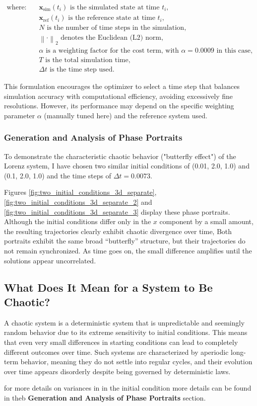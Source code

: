 \begin{align*}
\text{where:} \quad
& \mathbf{x}_{\text{sim}}(t_i) \text{ is the simulated state at time } t_i, \\
& \mathbf{x}_{\text{ref}}(t_i) \text{ is the reference state at time } t_i, \\
& N \text{ is the number of time steps in the simulation}, \\
& \left\| \cdot \right\|_2 \text{ denotes the Euclidean (L2) norm}, \\
& \alpha \text{ is a weighting factor for the cost term, with } \alpha = 0.0009 \text{ in this case}, \\
& T \text{ is the total simulation time}, \\
& \Delta t \text{ is the time step used.}
\end{align*}

\noindent
This formulation encourages the optimizer to select a time step that balances simulation accuracy with computational efficiency, avoiding excessively fine resolutions. However, its performance may depend on the specific weighting parameter $\alpha$ (manually tuned here) and the reference system used.


\subsubsection{Generation and Analysis of Phase Portraits}
To demonstrate the characteristic chaotic behavior ("butterfly effect") of the Lorenz system, I have chosen two similar initial conditions of (0.01, 2.0, 1.0) and (0.1, 2.0, 1.0) and the time steps of \(\Delta t = 0.0073\).

Figures \ref{fig:two_initial_conditions_3d_separate}, \ref{fig:two_initial_conditions_3d_separate_2} and \ref{fig:two_initial_conditions_3d_separate_3} display these phase portraits. Although the initial conditions differ only in the $x$ component by a small amount, the resulting trajectories clearly exhibit chaotic divergence over time, Both portraits exhibit the same broad “butterfly” structure, but their trajectories do not remain synchronized. As time goes on, the small difference amplifies until the solutions appear uncorrelated.

\subsection{What Does It Mean for a System to Be Chaotic?}
A chaotic system is a deterministic system that is unpredictable and seemingly random behavior due to its extreme sensitivity to initial conditions. This means that even very small differences in starting conditions can lead to completely different outcomes over time. Such systems are characterized by aperiodic long-term behavior, meaning they do not settle into regular cycles, and their evolution over time appears disorderly despite being governed by deterministic laws.

for more details on variances in in the initial condition more details can be found in theb \textbf{Generation and Analysis of Phase Portraits} section.